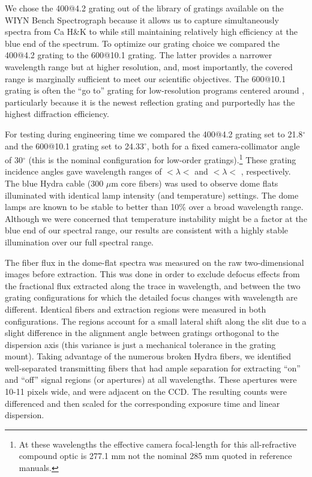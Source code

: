 We chose the 400@4.2 grating out of the library of gratings available
on the WIYN Bench Spectrograph because it allows us to capture
simultaneously spectra from Ca H\&K to \Ha while still maintaining
relatively high efficiency at the blue end of the spectrum.  To
optimize our grating choice we compared the 400@4.2 grating to the
600@10.1 grating. The latter provides a narrower wavelength range but
at higher resolution, and, most importantly, the covered range is
marginally sufficient to meet our scientific objectives.  The 600@10.1
grating is often the ``go to'' grating for low-resolution programs
centered around , particularly because it is the newest
reflection grating and purportedly has the highest diffraction
efficiency.

For testing during engineering time we compared the 400@4.2 grating
set to 21.8$^{\circ}$ and the 600@10.1 grating set to 24.33$^{\circ}$,
both for a fixed camera-collimator angle of 30$^{\circ}$ (this is the
nominal configuration for low-order gratings).\footnote{At these
  wavelengths the effective camera focal-length for this
  all-refractive compound optic is 277.1 mm not the nominal 285 mm
  quoted in reference manuals.} These grating incidence angles gave
wavelength ranges of $< \lambda <$  and
$< \lambda <$ , respectively. The blue
Hydra cable (300 $\mu$m core fibers) was used to observe dome flats
illuminated with identical lamp intensity (and temperature)
settings. The dome lamps are known to be stable to better than 10\%
over a broad wavelength range. Although we were concerned that
temperature instability might be a factor at the blue end of our
spectral range, our results are consistent with a highly stable
illumination over our full spectral range.

The fiber flux in the dome-flat spectra was measured on the raw
two-dimensional images before extraction. This was done in order to
exclude defocus effects from the fractional flux extracted along the
trace in wavelength, and between the two grating configurations for
which the detailed focus changes with wavelength are different.
Identical fibers and extraction regions were measured in both
configurations. The regions account for a small lateral shift along
the slit due to a slight difference in the alignment angle between
gratings orthogonal to the dispersion axis (this variance is just a
mechanical tolerance in the grating mount). Taking advantage of the
numerous broken Hydra fibers, we identified well-separated
transmitting fibers that had ample separation for extracting ``on''
and ``off'' signal regions (or apertures) at all wavelengths.  These
apertures were 10-11 pixels wide, and were adjacent on the CCD.  The
resulting counts were differenced and then scaled for the
corresponding exposure time and linear dispersion. 

